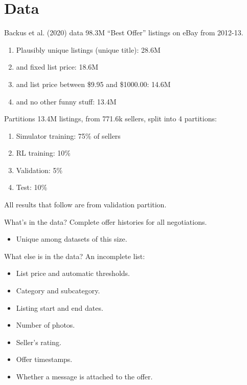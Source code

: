 \documentclass[aspectratio=169]{beamer}
\begin{document}
\section{Data}\label{sec:data}

\begin{frame}{Backus et al. (2020) data}
	98.3M ``Best Offer'' listings on eBay from 2012-13.\pause
	\begin{enumerate}
		\item Plausibly unique listings (unique title): 28.6M\pause
		\item and fixed list price: 18.6M\pause
		\item and list price between \$9.95 and \$1000.00: 14.6M\pause
		\item and no other funny stuff: 13.4M
	\end{enumerate}
\end{frame}

\begin{frame}{Partitions}
	13.4M listings, from 771.6k sellers, split into 4 partitions:
	\begin{enumerate}
		\item Simulator training: 75\% of sellers
		\item RL training: 10\%
		\item Validation: 5\%
		\item Test: 10\%
	\end{enumerate}
	\vspace{5mm}
	All results that follow are from validation partition.
\end{frame}

\begin{frame}{What's in the data?}
	Complete offer histories for all negotiations.
	\begin{itemize}
		\item Unique among datasets of this size.
	\end{itemize}
\end{frame}

\begin{frame}{What else is in the data?}
	An incomplete list:
	\begin{itemize}
		\item List price and automatic thresholds.
		\item Category and subcategory.
		\item Listing start and end dates.
		\item Number of photos.
		\item Seller's rating.
		\item Offer timestamps.
		\item Whether a message is attached to the offer.
	\end{itemize}
\end{frame}
\end{document}
